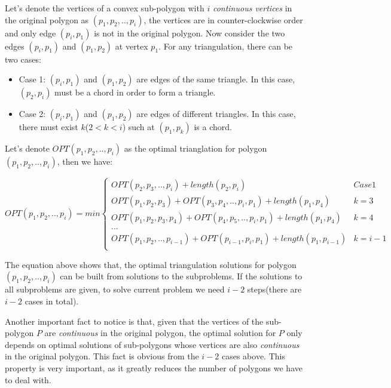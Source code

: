 Let's denote the vertices of a convex sub-polygon with $i$ \textit{continuous vertices} in the original polygon as $(p_1, p_2, .., p_i)$, the vertices are in counter-clockwise order and only edge $(p_i, p_1)$ is not in the original polygon. Now consider the two edges $(p_i, p_1)$ and $(p_1, p_2)$ at vertex $p_1$. For any triangulation, there can be two cases:

\begin{itemize}
\item{Case 1}: $(p_i, p_1)$ and $(p_1, p_2)$ are edges of the same triangle. In this case, $(p_2, p_i)$ must be a chord in order to form a triangle.
\item{Case 2}: $(p_i, p_1)$ and $(p_1, p_2)$ are edges of different triangles. In this case, there must exist $k$($2 < k < i$) such at $(p_1, p_k)$ is a chord.
\end{itemize}

Let's denote $OPT(p_1, p_2, .., p_i)$ as the optimal trianglation for polygon $(p_1, p_2, .., p_i)$, then we have:

\[
OPT(p_1, p_2, .., p_i) = min \left\{
  \begin{array}{ll}
    OPT(p_2, p_3, .., p_i) + length(p_2, p_i) & Case 1 \\
    OPT(p_1, p_2, p_3) + OPT(p_3, p_4, .., p_i, p_1) + length(p_1, p_4)  & k = 3 \\
    OPT(p_1, p_2, p_3, p_4) + OPT(p_4, p_5, .., p_i, p_1) + length(p_1, p_4)  & k = 4 \\
    ... & \\
    OPT(p_1, p_2, .., p_{i-1}) + OPT(p_{i-1}, p_i, p_1) + length(p_1, p_{i-1})  & k = i - 1 \\
  \end{array}\right.
\]

The equation above shows that, the optimal triangulation solutions for polygon $(p_1, p_2, .., p_i)$ can be built from solutions to the subproblems. If the solutions to all subproblems are given, to solve current problem we need $i-2$ steps(there are $i-2$ cases in total).

Another important fact to notice is that, given that the vertices of the sub-polygon $P$ are \textit{continuous} in the original polygon, the optimal solution for $P$ only depends on optimal solutions of sub-polygons whose vertices are also \textit{continuous} in the original polygon. This fact is obvious from the $i-2$ cases above. This property is very important, as it greatly reduces the number of polygons we have to deal with.

